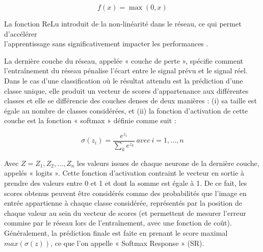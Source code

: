 \begin{equation}
    f(x)=\max{(0,x)}
    \label{eqmethodes.1}
\end{equation}

La fonction ReLu introduit de la non-linéarité dans le réseau, ce qui permet d’accélérer \\l’apprentissage sans significativement impacter les performances \citep{krizhevsky_imagenet_2012}.

La dernière couche du réseau, appelée « couche de perte », spécifie comment l’entraînement du réseau pénalise l’écart entre le signal prévu et le signal réel. Dans le cas d’une classification où le résultat attendu est la prédiction d’une classe unique, elle produit un vecteur de scores d’appartenance aux différentes classes et elle se différencie des couches denses de deux manières : (i) sa taille est égale au nombre de classes considérées, et (ii) la fonction d’activation de cette couche est la fonction « softmax » définie comme suit :

\begin{equation}
\sigma(z_i) = \displaystyle\frac{e^{z_i}}{\displaystyle\sum_{k} e^{z_k}}\ avec \ i = 1,...,n
\end{equation}

Avec $Z = {Z_1, Z_2, ..., Z_n}$ les valeurs issues de chaque neurone de la dernière couche, appelés « logits ». Cette fonction d’activation contraint le vecteur en sortie à prendre des valeurs entre 0 et 1 et dont la somme est égale à 1. De ce fait, les scores obtenus peuvent être considérés comme des probabilités que l’image en entrée appartienne à chaque classe considérée, représentés par la position de chaque valeur au sein du vecteur de scores (et permettent de mesurer l’erreur commise par le réseau lors de l’entraînement, avec une fonction de coût). Généralement, la prédiction finale est faite en prenant le score maximal $max(\sigma(z))$, ce que l’on appelle « Softmax Response » (SR).

\medskip

\setlength{\fboxsep}{5pt}
\setlength{\fboxrule}{0.6pt}
\noindent{}


